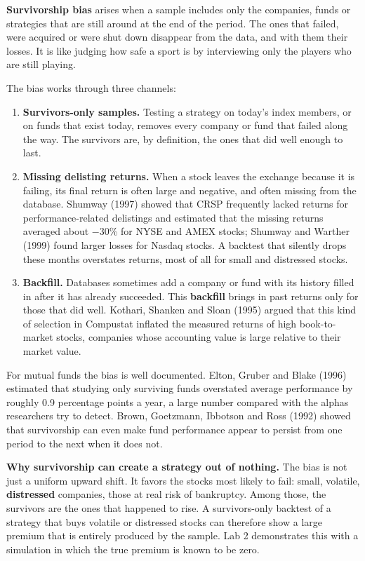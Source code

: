 \textbf{Survivorship bias} arises when a sample includes only the companies, funds or strategies that are still around at the end of the period. The ones that failed, were acquired or were shut down disappear from the data, and with them their losses. It is like judging how safe a sport is by interviewing only the players who are still playing.

The bias works through three channels:

\begin{enumerate}
  \item \textbf{Survivors-only samples.} Testing a strategy on today's index members, or on funds that exist today, removes every company or fund that failed along the way. The survivors are, by definition, the ones that did well enough to last.
  \item \textbf{Missing delisting returns.} When a stock leaves the exchange because it is failing, its final return is often large and negative, and often missing from the database. Shumway (1997) showed that CRSP frequently lacked returns for performance-related delistings and estimated that the missing returns averaged about $-30$\% for NYSE and AMEX stocks; Shumway and Warther (1999) found larger losses for Nasdaq stocks. A backtest that silently drops these months overstates returns, most of all for small and distressed stocks.
  \item \textbf{Backfill.} Databases sometimes add a company or fund with its history filled in after it has already succeeded. This \textbf{backfill} brings in past returns only for those that did well. Kothari, Shanken and Sloan (1995) argued that this kind of selection in Compustat inflated the measured returns of high book-to-market stocks, companies whose accounting value is large relative to their market value.
\end{enumerate}

For mutual funds the bias is well documented. Elton, Gruber and Blake (1996) estimated that studying only surviving funds overstated average performance by roughly 0.9 percentage points a year, a large number compared with the alphas researchers try to detect. Brown, Goetzmann, Ibbotson and Ross (1992) showed that survivorship can even make fund performance appear to persist from one period to the next when it does not.

\textbf{Why survivorship can create a strategy out of nothing.} The bias is not just a uniform upward shift. It favors the stocks most likely to fail: small, volatile, \textbf{distressed} companies, those at real risk of bankruptcy. Among those, the survivors are the ones that happened to rise. A survivors-only backtest of a strategy that buys volatile or distressed stocks can therefore show a large premium that is entirely produced by the sample. Lab 2 demonstrates this with a simulation in which the true premium is known to be zero.

